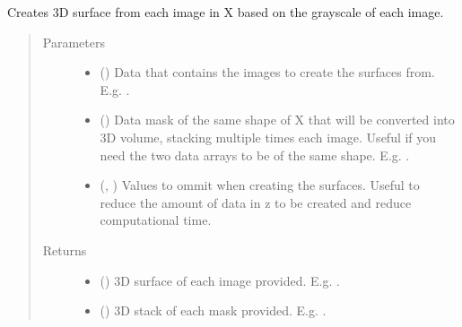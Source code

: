 \documentclass[letterpaper,10pt,english]{sphinxmanual}
\begin{document}
\begin{fulllineitems}
\label{\detokenize{utils/util:utils.util.grayscale_2D_image_to_3D}}
Creates 3D surface from each image in X based on the grayscale of each image.
\begin{quote}\begin{description}
\item[{Parameters}] \leavevmode\begin{itemize}
\item {} 
 () \textendash{} Data that contains the images to create the surfaces from. E.g. .

\item {} 
 () \textendash{} Data mask of the same shape of X that will be converted into 3D volume, stacking multiple times each image.
Useful if you need the two data arrays to be of the same shape. E.g. .

\item {} 
 (, ) \textendash{} Values to ommit when creating the surfaces. Useful to reduce the amount of data in z to be created and
reduce computational time.

\end{itemize}

\item[{Returns}] \leavevmode
\begin{itemize}
\item {} 
 () \textendash{} 3D surface of each image provided. E.g. .

\item {} 
 () \textendash{} 3D stack of each mask provided. E.g. .

\end{itemize}


\end{description}\end{quote}

\end{fulllineitems}
\end{document}
